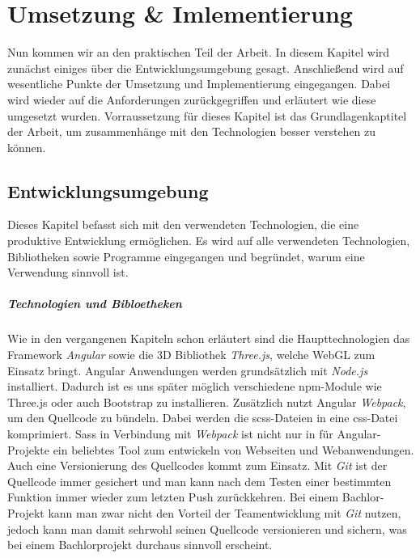 %
%
%
\chapter{Umsetzung \& Imlementierung}
\label{cha:umsetzung}
%
Nun kommen wir an den praktischen Teil der Arbeit. In diesem Kapitel wird zunächst einiges über die Entwicklungsumgebung gesagt. Anschließend wird auf wesentliche Punkte der Umsetzung und Implementierung eingegangen. Dabei wird wieder auf die Anforderungen zurückgegriffen und erläutert wie diese umgesetzt wurden. Vorraussetzung für dieses Kapitel ist das Grundlagenkaptitel der Arbeit, um zusammenhänge mit den Technologien besser verstehen zu können.
\section{Entwicklungsumgebung}
\label{sec:umsetzung}
%
Dieses Kapitel befasst sich mit den verwendeten Technologien, die eine produktive Entwicklung ermöglichen. Es wird auf alle verwendeten Technologien, Bibliotheken sowie Programme eingegangen und begründet, warum eine Verwendung sinnvoll ist.\\
\paragraph{Technologien und Bibloetheken}
Wie in den vergangenen Kapiteln schon erläutert sind die Haupttechnologien das Framework \textit{Angular} sowie die 3D Bibliothek \textit{Three.js}, welche WebGL zum Einsatz bringt. Angular Anwendungen werden grundsätzlich mit \textit{Node.js} installiert. Dadurch ist es uns später möglich verschiedene npm-Module wie Three.js oder auch Bootstrap zu installieren. Zusätzlich nutzt Angular \textit{Webpack}, um den Quellcode zu bündeln. Dabei werden die scss-Dateien in eine css-Datei komprimiert. Sass in Verbindung mit \textit{Webpack} ist nicht nur in für Angular-Projekte ein beliebtes Tool zum entwickeln von Webseiten und Webanwendungen. Auch eine Versionierung des Quellcodes kommt zum Einsatz. Mit \textit{Git} ist der Quellcode immer gesichert und man kann nach dem Testen einer bestimmten Funktion immer wieder zum letzten Push zurückkehren. Bei einem Bachlor-Projekt kann man zwar nicht den Vorteil der Teamentwicklung mit \textit{Git} nutzen, jedoch kann man damit sehrwohl seinen Quellcode versionieren und sichern, was bei einem Bachlorprojekt durchaus sinnvoll erscheint. 
